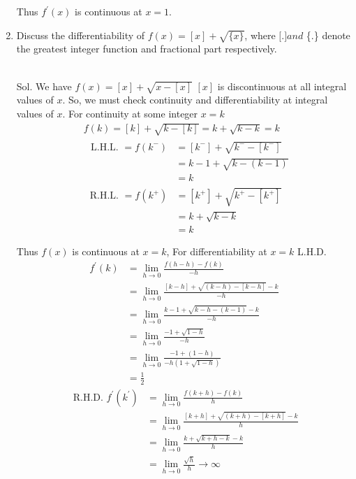 \begin{enumerate}
\begin{outline}
Thus $f^{\prime}(x)$ is continuous at $x=1$.
\end{outline}

\item Discuss the differentiability of $f(x)=[x]+\sqrt{\{x\}}$, where $[$.$] and$ \{.\} denote the greatest integer function and fractional part respectively.\\\\

\begin{outline}
    Sol. We have $f(x)=[x]+\sqrt{x-[x]}$
$[x]$ is discontinuous at all integral values of $x$.
So, we must check continuity and differentiability at integral values of $x$.
For continuity at some integer $x=k$
$$
\begin{aligned}
& f(k)=[k]+\sqrt{k-[k]}=k+\sqrt{k-k}=k \\
& \begin{aligned}
\text { L.H.L. }=f\left(k^{-}\right) & =\left[k^{-}\right]+\sqrt{k^{-}-\left[k^{-}\right]} \\
& =k-1+\sqrt{k-(k-1)} \\
& =k
\end{aligned}
\end{aligned}
$$
$$
\begin{aligned}
\text { R.H.L. }=f\left(k^{+}\right) & =\left[k^{+}\right]+\sqrt{k^{+}-\left[k^{+}\right]} \\
& =k+\sqrt{k-k} \\
& =k
\end{aligned}
$$

Thus $f(x)$ is continuous at $x=k$,
For differentiability at $x=k$
L.H.D.
$$
\begin{aligned}
f^{\prime}(k) & =\lim _{h \rightarrow 0} \frac{f(h-h)-f(k)}{-h} \\
& =\lim _{h \rightarrow 0} \frac{[k-h]+\sqrt{(k-h)-[k-h]}-k}{-h} \\
& =\lim _{h \rightarrow 0} \frac{k-1+\sqrt{k-h-(k-1)}-k}{-h} \\
& =\lim _{h \rightarrow 0} \frac{-1+\sqrt{1-h}}{-h} \\
& =\lim _{h \rightarrow 0} \frac{-1+(1-h)}{-h(1+\sqrt{1-h})} \\
& =\frac{1}{2}
\end{aligned}
$$
$$
\begin{aligned}
\text { R.H.D. } f^{\prime}\left(k^{\prime}\right) & =\lim _{h \rightarrow 0} \frac{f(k+h)-f(k)}{h} \\
& =\lim _{h \rightarrow 0} \frac{[k+h]+\sqrt{(k+h)-[k+h]}-k}{h} \\
& =\lim _{h \rightarrow 0} \frac{k+\sqrt{k+h-k}-k}{h} \\
& =\lim _{h \rightarrow 0} \frac{\sqrt{h}}{h} \rightarrow \infty
\end{aligned}
$$


\end{outline}
\end{enumerate}
